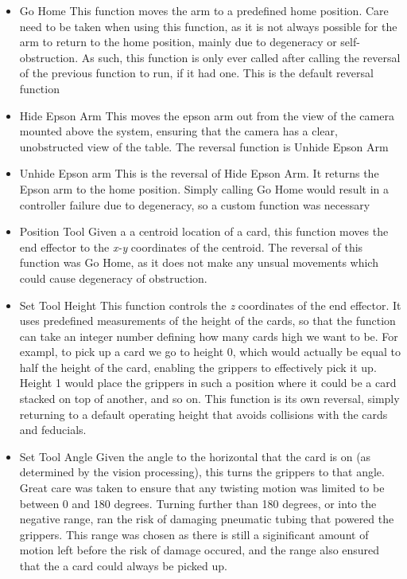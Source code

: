 \begin{itemize}
	
	\item Go Home
	\subitem This function moves the arm to a predefined home position. Care need to be taken when using this function, as it is not always possible for the arm to return to the home position, mainly due to degeneracy or self-obstruction. As such, this function is only ever called after calling the reversal of the previous function to run, if it had one.
	\subitem This is the default reversal function
	\item Hide Epson Arm
	\subitem This moves the epson arm out from the view of the camera mounted above the system, ensuring that the camera has a clear, unobstructed view of the table. 
	\subitem The reversal function is Unhide Epson Arm
	\item Unhide Epson arm
	\subitem This is the reversal of Hide Epson Arm. It returns the Epson arm to the home position. Simply calling Go Home would result in a controller failure due to degeneracy, so a custom function was necessary
	\item Position Tool
	\subitem Given a a centroid location of a card, this function moves the end effector to the \textit{x-y} coordinates of the centroid.
	\subitem The reversal of this function was Go Home, as it does not make any unsual movements which could cause degeneracy of obstruction.
	\item Set Tool Height
	\subitem This function controls the \textit{z} coordinates of the end effector. It uses predefined measurements of the height of the cards, so that the function can take an integer number defining how many cards high we want to be. For exampl, to pick up a card we go to height 0, which would actually be equal to half the height of the card, enabling the grippers to effectively pick it up. Height 1 would place the grippers in such a position where it could be a card stacked on top of another, and so on.
	\subitem This function is its own reversal, simply returning to a default operating height that avoids collisions with the cards and feducials.
	\item Set Tool Angle
	\subitem Given the angle to the horizontal that the card is on (as determined by the vision processing), this turns the grippers to that angle. Great care was taken to ensure that any twisting motion was limited to be between 0 and 180 degrees. Turning further than 180 degrees, or into the negative range, ran the risk of damaging pneumatic tubing that powered the grippers. This range was chosen as there is still a siginificant amount of motion left before the risk of damage occured, and the range also ensured that the a card could always be picked up.

\end{itemize}
